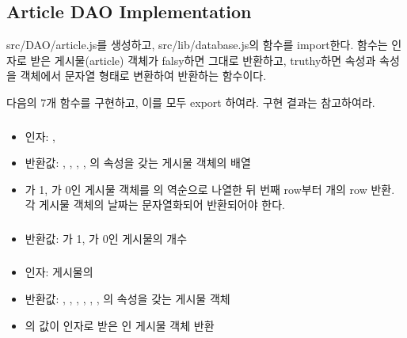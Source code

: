 \subsection*{Article DAO Implementation}

src/DAO/article.js를 생성하고, src/lib/database.js의  함수를 import한다.  함수는 인자로 받은 게시물(article) 객체가 falsy하면 그대로 반환하고, truthy하면  속성과  속성을  객체에서 문자열 형태로 변환하여 반환하는 함수이다.

다음의 7개 함수를 구현하고, 이를 모두 export 하여라. 구현 결과는 \를 참고하여라.

\subsubsection*{}
\begin{itemize}
    \item 인자: , 
    \item 반환값: , , , , 의  속성을 갖는 게시물 객체의 배열
    \item {}가 1, 가 0인 게시물 객체를 의 역순으로 나열한 뒤 번째 row부터 개의 row 반환. 각 게시물 객체의 날짜는 문자열화되어 반환되어야 한다.
\end{itemize}

\subsubsection*{}
\begin{itemize}
    \item 반환값: 가 1, 가 0인 게시물의 개수
\end{itemize}

\subsubsection*{}
\begin{itemize}
    \item 인자: 게시물의 
    \item 반환값: , , , , , , 의  속성을 갖는 게시물 객체
    \item {}의 값이 인자로 받은 인 게시물 객체 반환
\end{itemize}

